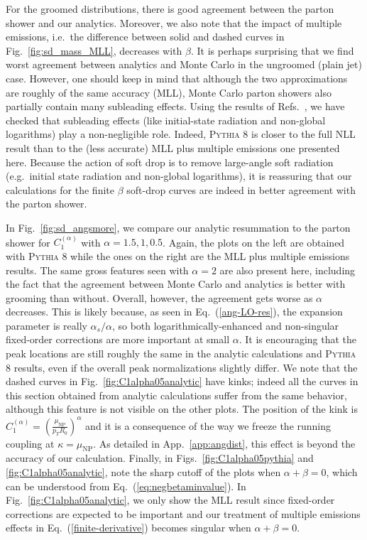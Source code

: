 \documentclass[letterpaper,11pt]{article}
\newcommand{\C}[2]{C^{(#2)}_{#1}}
\newcommand{\ea}{{\C{1}{\alpha}}}
\DeclareRobustCommand{\App}[1]{App.~\ref{#1}}
\DeclareRobustCommand{\Fig}[1]{Fig.~\ref{#1}}
\DeclareRobustCommand{\Figs}[2]{Figs.~\ref{#1} and \ref{#2}}
\DeclareRobustCommand{\Eq}[1]{Eq.~(\ref{#1})}
\DeclareRobustCommand{\Refs}[1]{Refs.~\cite{#1}}
\newcommand{\pythia}[1]{\textsc{Pythia\xspace #1}}
\begin{document}
For the groomed distributions, there is good agreement between the parton shower and our analytics.  
Moreover, we also note that the impact of multiple emissions, i.e.\ the difference between solid and dashed curves in \Fig{fig:sd_mass_MLL}, decreases with $\beta$.
%
It is perhaps surprising that we find worst agreement between analytics and Monte Carlo in the ungroomed (plain jet) case.  However, one should keep in mind that although the two approximations are roughly of the same accuracy (MLL), Monte Carlo parton showers also partially contain many subleading effects. Using the results of \Refs{BDKM,DKMS}, we have checked that subleading effects (like initial-state radiation and non-global logarithms) play a non-negligible role.  Indeed, \pythia{8} is closer to the full NLL result than to the (less accurate) MLL plus multiple emissions one presented here.  Because the action of soft drop is to remove large-angle soft radiation (e.g.\ initial state radiation and non-global logarithms), it is reassuring that our calculations for the finite $\beta$ soft-drop curves are indeed in better agreement with the parton shower.

In \Fig{fig:sd_angsmore}, we compare our analytic resummation to the parton shower for $\ea$ with $\alpha=1.5,1,0.5$.  Again, the plots on the left are obtained with \pythia{8} while the ones on the right are the MLL plus multiple emissions results.   The same gross features seen with $\alpha = 2$ are also present here, including the fact that the agreement between Monte Carlo and analytics is better with grooming than without.   Overall, however, the agreement gets worse as $\alpha$ decreases.  This is likely because, as seen in \Eq{ang-LO-res}, the expansion parameter is really $\alpha_s/\alpha$, so both logarithmically-enhanced and non-singular fixed-order corrections are more important at small $\alpha$.  It is encouraging that the peak locations are still roughly the same in the analytic calculations and \pythia{8} results, even if the overall peak normalizations slightly differ.
We note that the dashed curves in \Fig{fig:C1alpha05analytic} have kinks; indeed all the curves in this section obtained from analytic calculations suffer from the same behavior, although this feature is not visible on the other plots. The position of the kink is %
$\ea =\left(\frac{\mu_\text{NP}}{p_T R_0} \right)^\alpha$
 and it is a consequence of the way we freeze the running coupling at $\kappa=\mu_\text{NP}$. As detailed in \App{app:angdist}, this effect is beyond the accuracy of our calculation.
Finally,  in \Figs{fig:C1alpha05pythia}{fig:C1alpha05analytic}, note the sharp cutoff of the plots when $\alpha + \beta = 0$, which can be understood from \Eq{eq:negbetaminvalue}.
In \Fig{fig:C1alpha05analytic}, we only show the MLL result since fixed-order corrections are expected to be important and our treatment of multiple emissions effects in \Eq{finite-derivative} becomes singular when $\alpha+\beta=0$.
\end{document}
